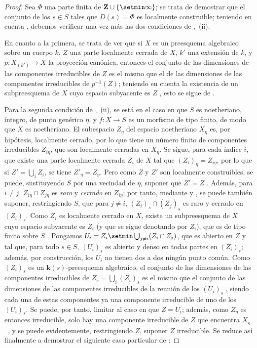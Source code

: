 \begin{proof}
Sea $\Phi$ una parte finita de $\mathbf Z\cup\{\setmin\infty\}$; se trata de demostrar que el conjunto de los $s\in S$ tales que $D(s)=\Phi$ es localmente construible; teniendo en cuenta , debemos verificar una vez más las dos condiciones de ,~(ii).

En cuanto a la primera, se trata de ver que si $X$ es un preesquema algebraico sobre un cuerpo $k$, $Z$ una parte localmente cerrada de $X$, $k'$ una extensión de $k$, y $p:X_{(k')}\to X$ la proyección canónica, entonces el conjunto de las dimensiones de las componentes irreducibles de $Z$ es el mismo que el de las dimensiones de las componentes irreducibles de $p^{-1}(Z)$; teniendo en cuenta la existencia de un subpreesquema de $X$ cuyo espacio subyacente es $Z$ , esto se sigue de .

Para la segunda condición de ,~(ii), se está en el caso en que $S$ es noetheriano, íntegro, de punto genérico $\eta$, y $f:X\to S$ es un morfismo de tipo finito, de modo que $X$ es noetheriano.
El subespacio $Z_\eta$ del espacio noetheriano $X_\eta$ es, por hipótesis, localmente cerrado, por lo que tiene un número finito de componentes irreducibles $Z_{i\eta}$, que son localmente cerradas en $X_\eta$.
Se sigue, para cada índice $i$, que existe una parte localmente cerrada $Z_i$ de $X$ tal que $(Z_i)_\eta=Z_{i\eta}$, por lo que si $Z'=\bigcup_i Z_i$, se tiene $Z'_\eta=Z_\eta$.
Pero como $Z$ y $Z'$ son localmente construibles, se puede, sustituyendo $S$ por una vecindad de $\eta$, suponer que $Z'=Z$ .
Además, para $i\neq j$, $Z_{i\eta}\cap Z_{j\eta}$ es \emph{raro} y \emph{cerrado} en $Z_{i\eta}$; por tanto, mediante  y , se puede también suponer, restringiendo $S$, que para $j\neq i$, $(Z_i)_s\cap(Z_j)_s$ es raro y cerrado en $(Z_i)_s$.
Como $Z_i$ es localmente cerrado en $X$, existe un subpreesquema de $X$ cuyo espacio subyacente es $Z_i$ (y que se sigue denotando por $Z_i$), que es de tipo finito sobre $S$ .
Pongamos $U_i=Z_i\setmin\bigcup_{j\neq i}(Z_i\cap Z_j)$, que es abierto en $Z$ y tal que, para todo $s\in S$, $(U_i)_s$ es abierto y denso en todas partes en $(Z_i)_s$; además, por construcción, los $U_i$ no tienen dos a dos ningún punto común.
Como $(Z_i)_s$ es un $\boldsymbol{k}(s)$-preesquema algebraico, el conjunto de las dimensiones de las componentes irreducibles de $Z_s=\bigcup_i(Z_i)_s$ es el mismo que el conjunto de las dimensiones de las componentes irreducibles de la reunión de los $(U_i)_s$ , siendo cada una de estas componentes ya una componente irreducible de uno de los $(U_i)_s$.
Se puede, por tanto, limitar al caso en que $Z=U_i$; además, como $Z_\eta$ es entonces irreducible, solo hay una componente irreducible de $Z$ que encuentra $X_\eta$~, y se puede evidentemente, restringiendo $Z$, suponer $Z$ irreducible.
Se reduce así finalmente a demostrar el siguiente caso particular de :
\end{proof}

